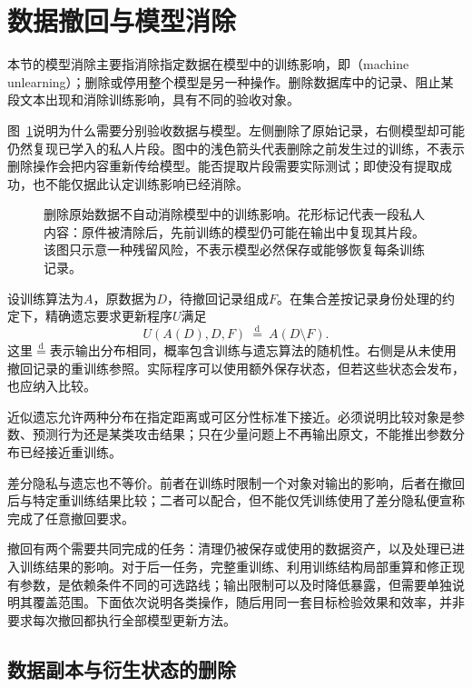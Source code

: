 \section{数据撤回与模型消除}
\label{sec:privacy-unlearning}

本节的模型消除主要指消除指定数据在模型中的训练影响，即（machine unlearning）；删除或停用整个模型是另一种操作。删除数据库中的记录、阻止某段文本出现和消除训练影响，具有不同的验收对象。

图~\ref{fig:trust-privacy-deletion}说明为什么需要分别验收数据与模型。左侧删除了原始记录，右侧模型却可能仍然复现已学入的私人片段。图中的浅色箭头代表删除之前发生过的训练，不表示删除操作会把内容重新传给模型。能否提取片段需要实际测试；即使没有提取成功，也不能仅据此认定训练影响已经消除。

\begin{figure}[!htb]
  \centering
  \caption{删除原始数据不自动消除模型中的训练影响。花形标记代表一段私人内容：原件被清除后，先前训练的模型仍可能在输出中复现其片段。该图只示意一种残留风险，不表示模型必然保存或能够恢复每条训练记录。}
  \label{fig:trust-privacy-deletion}
\end{figure}

设训练算法为$A$，原数据为$D$，待撤回记录组成$F$。在集合差按记录身份处理的约定下，精确遗忘要求更新程序$U$满足
\begin{equation}
 U(A(D),D,F)\ \overset{\mathrm d}{=}\ A(D\setminus F).
 \label{eq:privacy-exact-unlearning}
\end{equation}
这里$\overset{\mathrm d}{=}$表示输出分布相同，概率包含训练与遗忘算法的随机性。右侧是从未使用撤回记录的重训练参照。实际程序可以使用额外保存状态，但若这些状态会发布，也应纳入比较。

近似遗忘允许两种分布在指定距离或可区分性标准下接近。必须说明比较对象是参数、预测行为还是某类攻击结果；只在少量问题上不再输出原文，不能推出参数分布已经接近重训练。

差分隐私与遗忘也不等价。前者在训练时限制一个对象对输出的影响，后者在撤回后与特定重训练结果比较；二者可以配合，但不能仅凭训练使用了差分隐私便宣称完成了任意撤回要求。

撤回有两个需要共同完成的任务：清理仍被保存或使用的数据资产，以及处理已进入训练结果的影响。对于后一任务，完整重训练、利用训练结构局部重算和修正现有参数，是依赖条件不同的可选路线；输出限制可以及时降低暴露，但需要单独说明其覆盖范围。下面依次说明各类操作，随后用同一套目标检验效果和效率，并非要求每次撤回都执行全部模型更新方法。

\subsection{数据副本与衍生状态的删除}
\label{sec:privacy-asset-deletion}

